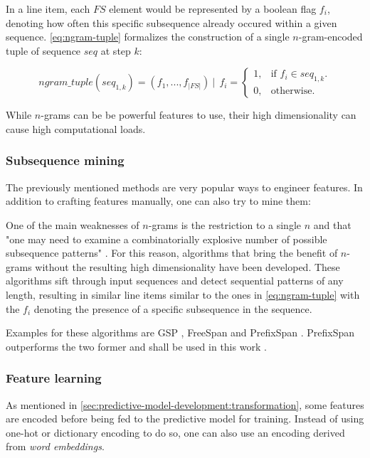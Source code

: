In a line item, each $FS$ element would be represented by a boolean flag $f_i$, denoting how often this specific subsequence already occured within a given sequence. \autoref{eq:ngram-tuple} formalizes the construction of a single $n$-gram-encoded tuple of sequence $seq$ at step $k$:

\begin{equation}\label{eq:ngram-tuple}
    ngram\_tuple(seq_{1,k}) = (f_1, ..., f_{|FS|})\ |\ \ f_i = 
    \begin{cases}
    1, & \text{if $f_i \in seq_{1,k}$}.\\
    0, & \text{otherwise}.
    \end{cases}
\end{equation}

While $n$-grams can be be powerful features to use, their high dimensionality can cause high computational loads.

\subsubsection{Subsequence mining}
The previously mentioned methods are very popular ways to engineer features. In addition to crafting features manually, one can also try to mine them:

One of the main weaknesses of $n$-grams is the restriction to a single $n$ and that "one may need to examine a combinatorially explosive
number of possible subsequence patterns" \cite{pei2001prefixspan}. For this reason, algorithms that bring the benefit of $n$-grams without the resulting high dimensionality have been developed. These algorithms sift through input sequences and detect sequential patterns of any length, resulting in similar line items similar to the ones in \autoref{eq:ngram-tuple} with the $f_i$ denoting the presence of a specific subsequence in the sequence.

Examples for these algorithms are GSP \cite{srikant1996gsp}, FreeSpan \cite{han2000freespan} and PrefixSpan \cite{pei2001prefixspan}. PrefixSpan outperforms the two former and shall be used in this work \cite{pei2001prefixspan}.

\subsubsection{Feature learning}
As mentioned in \autoref{sec:predictive-model-development:transformation}, some features are encoded before being fed to the predictive model for training. Instead of using one-hot or dictionary encoding to do so, one can also use an encoding derived from \textit{word embeddings}.

